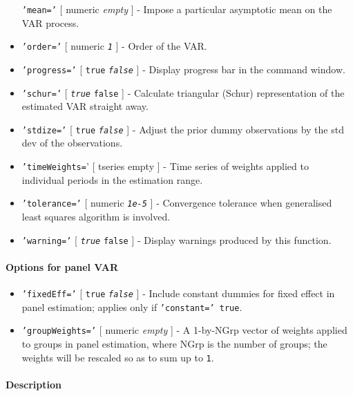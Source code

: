 \begin{itemize}
  \texttt{'mean='} {[} numeric \textbar{} \emph{empty} {]} - Impose a
  particular asymptotic mean on the VAR process.
\item
  \texttt{'order='} {[} numeric \textbar{} \emph{\texttt{1}} {]} - Order
  of the VAR.
\item
  \texttt{'progress='} {[} \texttt{true} \textbar{}
  \emph{\texttt{false}} {]} - Display progress bar in the command
  window.
\item
  \texttt{'schur='} {[} \emph{\texttt{true}} \textbar{} \texttt{false}
  {]} - Calculate triangular (Schur) representation of the estimated VAR
  straight away.
\item
  \texttt{'stdize='} {[} \texttt{true} \textbar{} \emph{\texttt{false}}
  {]} - Adjust the prior dummy observations by the std dev of the
  observations.
\item
  \texttt{'timeWeights=}' {[} tseries \textbar{} empty {]} - Time series
  of weights applied to individual periods in the estimation range.
\item
  \texttt{'tolerance='} {[} numeric \textbar{} \emph{\texttt{1e-5}} {]}
  - Convergence tolerance when generalised least squares algorithm is
  involved.
\item
  \texttt{'warning='} {[} \emph{\texttt{true}} \textbar{} \texttt{false}
  {]} - Display warnings produced by this function.
\end{itemize}

\paragraph{Options for panel VAR}\label{options-for-panel-var}

\begin{itemize}
\item
  \texttt{'fixedEff='} {[} \texttt{true} \textbar{}
  \emph{\texttt{false}} {]} - Include constant dummies for fixed effect
  in panel estimation; applies only if \texttt{'constant=' true}.
\item
  \texttt{'groupWeights='} {[} numeric \textbar{} \emph{empty} {]} - A
  1-by-NGrp vector of weights applied to groups in panel estimation,
  where NGrp is the number of groups; the weights will be rescaled so as
  to sum up to \texttt{1}.
\end{itemize}

\paragraph{Description}\label{description}

